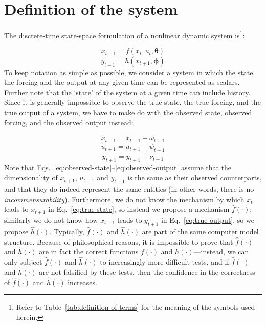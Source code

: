\section{Definition of the system}


The discrete-time state-space formulation of a nonlinear dynamic system is\footnote{Refer to Table~\ref{tab:definition-of-terms} for the meaning of the symbols used herein.}:

\begin{equation}\label{eq:true-state}
x_{t+1}=f(x_t,u_t,\boldsymbol\theta)
\end{equation}
\begin{equation}\label{eq:true-output}
y_{t+1}=h(x_{t+1},\boldsymbol\phi)
\end{equation}
To keep notation as simple as possible, we consider a system in which the state, the forcing and the output at any given time can be represented as scalars. Further note that the `state' of the system at a given time can include history.
Since it is generally impossible to observe the true state, the true forcing, and the true output of a system, we have to make do with the observed state, observed forcing, and the observed output instead:

\begin{equation}\label{eq:observed-state}
\tilde{x}_{t+1}=x_{t+1} + \omega_{t+1}
\end{equation}
\begin{equation}\label{eq:observed-forcing}
\tilde{u}_{t+1}=u_{t+1} + \psi_{t+1}
\end{equation}
\begin{equation}\label{eq:observed-output}
\tilde{y}_{t+1}=y_{t+1} + \nu_{t+1}
\end{equation}
Note that Eqs.~\ref{eq:observed-state}--\ref{eq:observed-output} assume that the dimensionality of $x_{t+1}$, $u_{t+1}$ and $y_{t+1}$ is the same as their observed counterparts, and that they do indeed represent the same entities (in other words, there is no \textit{incommensurability}). Furthermore, we do not know the mechanism by which $x_t$ leads to $x_{t+1}$ in Eq.~\ref{eq:true-state}, so instead we propose a mechanism $\hat{f}(\cdot{})$; similarly we do not know how $x_{t+1}$ leads to $y_{t+1}$ in Eq.~\ref{eq:true-output}, so we propose $\hat{h}(\cdot{})$. Typically, $\hat{f}(\cdot{})$ and $\hat{h}(\cdot{})$ are part of the same computer model structure. Because of philosophical reasons, it is impossible to prove that $\hat{f}(\cdot{})$ and $\hat{h}(\cdot{})$ are in fact the correct functions $f(\cdot{})$ and $h(\cdot{})$---instead, we can only subject $\hat{f}(\cdot{})$ and $\hat{h}(\cdot{})$ to increasingly more difficult tests, and if $\hat{f}(\cdot{})$ and $\hat{h}(\cdot{})$ are not falsified by these tests, then the confidence in the correctness of $\hat{f}(\cdot{})$ and $\hat{h}(\cdot{})$ increases.


